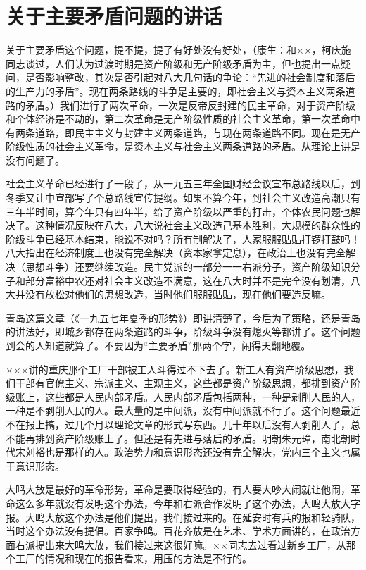 \section[关于主要矛盾问题的讲话（一九五八年八月）]{关于主要矛盾问题的讲话}


关于主要矛盾这个问题，提不提，提了有好处没有好处，（康生：和××，柯庆施同志谈过，人们认为过渡时期是资产阶级和无产阶级矛盾为主，但也提出一点疑问，是否影响整改，其次是否引起对八大几句话的争论：“先进的社会制度和落后的生产力的矛盾”。现在两条路线的斗争是主要的，即社会主义与资本主义两条道路的矛盾。）我们进行了两次革命，一次是反帝反封建的民主革命，对于资产阶级和个体经济是不动的，第二次革命是无产阶级性质的社会主义革命，第一次革命中有两条道路，即民主主义与封建主义两条道路，与现在两条道路不同。现在是无产阶级性质的社会主义革命，是资本主义与社会主义两条道路的矛盾。从理论上讲是没有问题了。

社会主义革命已经进行了一段了，从一九五三年全国财经会议宣布总路线以后，到冬季又让中宣部写了个总路线宣传提纲。如果不算今年，到社会主义改造高潮只有三年半时间，算今年只有四年半，给了资产阶级以严重的打击，个体农民问题也解决了。这种情况反映在八大，八大说社会主义改造己基本胜利，大规模的群众性的阶级斗争已经基本结束，能说不对吗？所有制解决了，人家服服贴贴打锣打鼓吗！八大指出在经济制度上也没有完全解决（资本家拿定息），在政治上也没有完全解决（思想斗争）还要继续改造。民主党派的一部分一一右派分子，资产阶级知识分子和部分富裕中农还对社会主义改造不满意，这在八大时并不是完全没有划清，八大并没有放松对他们的思想改造，当时他们服服贴贴，现在他们要造反嘛。

青岛这篇文章（《一九五七年夏季的形势》）即讲清楚了，今后为了策略，还是青岛的讲法好，即城乡都存在两条道路的斗争，阶级斗争没有熄灭等都讲了。这个问题到会的人知道就算了。不要因为“主要矛盾”那两个字，闹得天翻地覆。

×××讲的重庆那个工厂干部被工人斗得过不下去了。新工人有资产阶级思想，我们干部有官僚主义、宗派主义、主观主义，这些都是资产阶级思想，都排到资产阶级账上，这些都是人民内部矛盾。人民内部矛盾包括两种，一种是剥削人民的人，一种是不剥削人民的人。最大量的是中间派，没有中间派就不行了。这个问题最近不在报上搞，过几个月以理论文章的形式写东西。几十年以后没有人剥削人了，总不能再排到资产阶级账上了。但还是有先进与落后的矛盾。明朝朱元璋，南北朝时代宋刘裕也是那样的人。政治势力和意识形态还没有完全解决，党内三个主义也属于意识形态。

大鸣大放是最好的革命形势，革命是要取得经验的，有人要大吵大闹就让他闹，革命这么多年就没有发明这个办法，今年和右派合作发明了这个办法，大鸣大放大字报。大鸣大放这个办法是他们提出，我们接过来的。在延安时有兵的报和轻骑队，当时这个办法没有提倡。百家争鸣。百花齐放是在艺术、学术方面讲的，在政治方面右派提出来大鸣大放，我们接过来这很好嘛。××同志去过看过新乡工厂，从那个工厂的情况和现在的报告看来，用压的方法是不行的。

